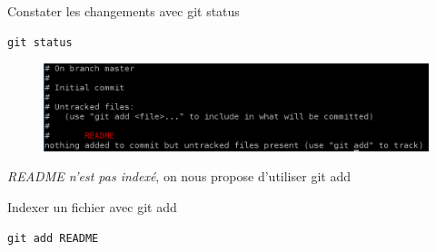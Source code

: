 \documentclass{beamer}
\begin{document}
\begin{frame}[fragile]{Constater les changements avec git status}
	\begin{lstlisting}[frame=single]
		git status
	\end{lstlisting}
	\begin{figure}
		\centering
		\includegraphics[width=11.5cm]{img/shot1}
	\end{figure}
	\begin{center}
	\textit{README n'est pas indexé}, on nous propose d'utiliser git add
	\end{center}
\end{frame}

\begin{frame}[fragile]{Indexer un fichier avec git add}
	\begin{lstlisting}[frame=single]
		git add README
	\end{lstlisting}
	
	\begin{figure}
  		\centering
	\end{figure}
\end{frame}
\end{document}
